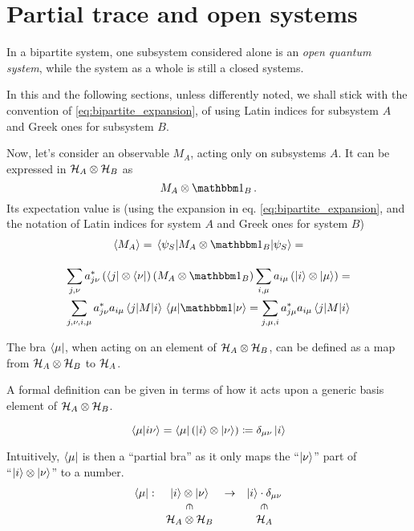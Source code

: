 \section{Partial trace and open systems}
\label{sec:p_tr}

In a bipartite system, one subsystem considered alone is an
\emph{open quantum system},
while the system as a whole is still a closed systems.

In this and the following sections, unless differently noted,
we shall stick with the convention of \eqref{eq:bipartite_expansion},
of using
Latin indices for subsystem $A$ and Greek ones for subsystem $B$.

Now, let's consider an observable $M_A$, acting only on subsystems $A$.
It can be expressed in $\mathcal{H}_A \otimes \mathcal{H}_B$ as
\[
  M_A \otimes \idop_B\, .
\]
Its expectation value is
(using the expansion in eq. \eqref{eq:bipartite_expansion},
and the notation of Latin indices for system $A$ and Greek ones for system $B$)
\begin{multline}\label{eq:exp_subsys}
  \expval{M_A} = \matrixel{\psi_S}{M_A\otimes\idop_B}{\psi_S} = \\[1em]
  \sum_{j,\nu}a^{*}_{j\nu}\left(\bra{j}\otimes\bra{\nu}\right)\left(M_A\otimes\idop_B\right)\sum_{i,\mu}a_{i\mu}\left(\ket{i}\otimes\ket{\mu}\right) = \\
  \sum_{j,\nu,i,\mu}a^{*}_{j\nu}a_{i\mu}\matrixel{j}{M}{i}\matrixel{\mu}{\idop}{\nu} =
  \sum_{j,\mu,i}a^{*}_{j\mu}a_{i\mu}\matrixel{j}{M}{i}
\end{multline}

The bra $\bra{\mu}$, when acting on an element of $\mathcal{H}_{A} \otimes \mathcal{H}_{B}$,
can be defined
as a map from $\mathcal{H}_A\otimes\mathcal{H}_B$ to $\mathcal{H}_A$.

A formal definition can be given in terms of how it acts upon a generic
basis element of $\mathcal{H}_A\otimes\mathcal{H}_B$.

\begin{definition}\label{def:pBra}
\[
  \braket{\mu}{i\nu} = \bra{\mu}\left(\ket{i}\otimes\ket{\nu}\right) \coloneqq \delta_{\mu\nu}\ket{i}
\]
\end{definition}

Intuitively, $\bra{\mu}$ is then a ``partial bra''
as it only maps the ``$\ket{\nu}$'' part of\\
``$\ket{i}\otimes\ket{\nu}$''
to a number.
\[
  \begin{array}{cccc}
    \bra{\mu}:  & \ket{i}\ox\ket{\nu}                   & \rightarrow & \ket{i}\cdot\delta_{\mu\nu}           \\
                & \rotatebox[origin=c]{270}{$\in$}      &             & \rotatebox[origin=c]{270}{$\in$}      \\
                & \hilb{H}_A\ox\hilb{H}_B               &             & \hilb{H}_A
  \end{array}
\]

